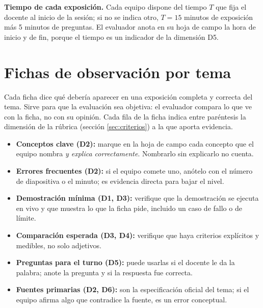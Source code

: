 \documentclass[11pt,a4paper]{article}
\begin{document}
\textbf{Tiempo de cada exposición.} Cada equipo dispone del tiempo $T$ que fija el docente al inicio de la sesión; si no se indica otro, $T = 15$ minutos de exposición más 5 minutos de preguntas. El evaluador anota en su hoja de campo la hora de inicio y de fin, porque el tiempo es un indicador de la dimensión D5.

\section{Fichas de observación por tema}\label{sec:fichas}

Cada ficha dice qué debería aparecer en una exposición completa y correcta del tema. Sirve para que la evaluación sea objetiva: el evaluador compara lo que ve con la ficha, no con su opinión. Cada fila de la ficha indica entre paréntesis la dimensión de la rúbrica (sección \ref{sec:criterios}) a la que aporta evidencia.

\begin{infoBox}[title={Cómo usar las fichas}]
	\begin{itemize}
		\item \textbf{Conceptos clave (D2):} marque en la hoja de campo cada concepto que el equipo nombra \emph{y explica correctamente}. Nombrarlo sin explicarlo no cuenta.
		\item \textbf{Errores frecuentes (D2):} si el equipo comete uno, anótelo con el número de diapositiva o el minuto; es evidencia directa para bajar el nivel.
		\item \textbf{Demostración mínima (D1, D3):} verifique que la demostración se ejecuta en vivo y que muestra lo que la ficha pide, incluido un caso de fallo o de límite.
		\item \textbf{Comparación esperada (D3, D4):} verifique que haya criterios explícitos y medibles, no solo adjetivos.
		\item \textbf{Preguntas para el turno (D5):} puede usarlas si el docente le da la palabra; anote la pregunta y si la respuesta fue correcta.
		\item \textbf{Fuentes primarias (D2, D6):} son la especificación oficial del tema; si el equipo afirma algo que contradice la fuente, es un error conceptual.
	\end{itemize}
\end{infoBox}

\end{document}
